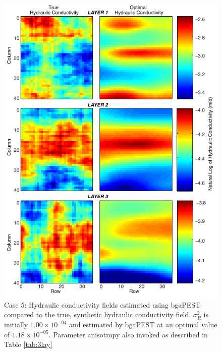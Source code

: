 \documentclass[11pt,oneside,onecolumn]{usgsreport}
\begin{document}
\begin{appendix}
\begin{figure}[!t]
\begin{center}\includegraphics{figures/3KL_case5}\end{center}

\caption{\label{fig:3LK_case5}Case 5: Hydraulic conductivity fields estimated
using bgaPEST compared to the true, synthetic hydraulic conductivity
field. $\sigma_{R}^{2}$ is initially $1.00\times10^{-04}$ and estimated by bgaPEST at an optimal value of $1.18\times10^{-05}$. Parameter anisotropy also invoked as described in Table \ref{tab:3lay}}
\end{figure}



\end{appendix}
\end{document}
